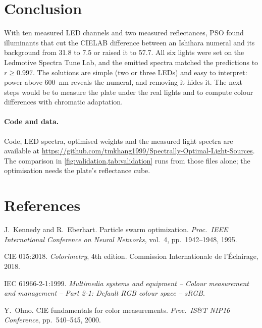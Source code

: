 \documentclass[10pt,a4paper]{article}
\begin{document}
\section{Conclusion}

With ten measured LED channels and two measured reflectances, PSO found illuminants that cut the CIELAB difference
between an Ishihara numeral and its background from 31.8 to 7.5 or raised it to 57.7. All six lights were set on the
Ledmotive Spectra Tune Lab, and the emitted spectra matched the predictions to $r \ge 0.997$. The solutions are simple
(two or three LEDs) and easy to interpret: power above \SI{600}{nm} reveals the numeral, and removing it hides it.
The next steps would be to measure the plate under the real lights and to compute colour differences with
chromatic adaptation.

\paragraph{Code and data.} Code, LED spectra, optimised weights and the measured light spectra are available at
\url{https://github.com/tmkhang1999/Spectrally-Optimal-Light-Sources}. The comparison in
\cref{fig:validation,tab:validation} runs from those files alone; the optimisation needs the plate's reflectance cube.

\section*{References}
\small
\begin{enumerate}[label={[\arabic*]}, leftmargin=2em]
  \item J.~Kennedy and R.~Eberhart. Particle swarm optimization. \emph{Proc.\ IEEE International Conference on
  Neural Networks}, vol.~4, pp.~1942--1948, 1995.
  \item CIE 015:2018. \emph{Colorimetry}, 4th edition. Commission Internationale de l'\'Eclairage, 2018.
  \item IEC 61966-2-1:1999. \emph{Multimedia systems and equipment -- Colour measurement and management -- Part 2-1:
  Default RGB colour space -- sRGB}.
  \item Y.~Ohno. CIE fundamentals for color measurements. \emph{Proc.\ IS\&T NIP16 Conference}, pp.~540--545, 2000.
\end{enumerate}
\end{document}
